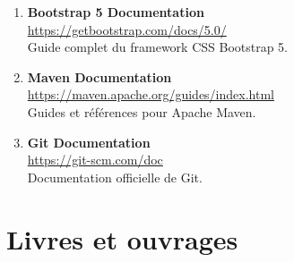 \documentclass[12pt,a4paper]{report}
\begin{document}
\begin{enumerate}
    \item \textbf{Bootstrap 5 Documentation} \\
    \url{https://getbootstrap.com/docs/5.0/} \\
    Guide complet du framework CSS Bootstrap 5.
    
    \item \textbf{Maven Documentation} \\
    \url{https://maven.apache.org/guides/index.html} \\
    Guides et références pour Apache Maven.
    
    \item \textbf{Git Documentation} \\
    \url{https://git-scm.com/doc} \\
    Documentation officielle de Git.
\end{enumerate}

\section*{Livres et ouvrages}
\end{document}

